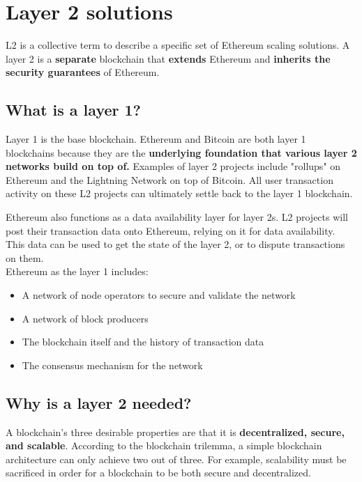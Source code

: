 \documentclass[MSE,Master,english]{twbook}%
\begin{document}
\section{Layer 2 solutions\label{layer2}}
\ac{L2}\cite{l2} is a collective term to describe a specific set of Ethereum scaling solutions. A layer 2 is a \textbf{separate} blockchain that \textbf{extends} Ethereum and \textbf{inherits the security guarantees} of Ethereum.

\subsection{What is a layer 1?}
Layer 1 is the base blockchain. Ethereum and Bitcoin are both layer 1 blockchains because they are the \textbf{underlying foundation that various layer 2 networks build on top of.} Examples of layer 2 projects include "rollups" on Ethereum and the Lightning Network on top of Bitcoin. All user transaction activity on these \ac{L2} projects can ultimately settle back to the layer 1 blockchain.

Ethereum also functions as a data availability layer for layer 2s. \ac{L2} projects will post their transaction data onto Ethereum, relying on it for data availability. This data can be used to get the state of the layer 2, or to dispute transactions on them. \\

Ethereum as the layer 1 includes:

\begin{itemize}
  \item A network of node operators to secure and validate the network
  \item A network of block producers
  \item The blockchain itself and the history of transaction data
  \item The consensus mechanism for the network
\end{itemize}

\subsection{Why is a layer 2 needed?}
A blockchain's three desirable properties are that it is \textbf{decentralized, secure, and scalable}. According to the blockchain trilemma, a simple blockchain architecture can only achieve two out of three. For example, scalability must be sacrificed in order for a blockchain to be both secure and decentralized.
\end{document}
